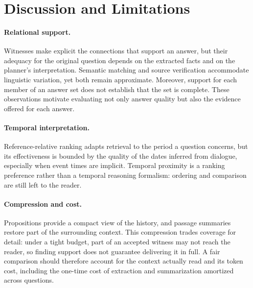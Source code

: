 \section{Discussion and Limitations}
\label{sec:discussion}

\paragraph{Relational support.}
Witnesses make explicit the connections that support an answer, but
their adequacy for the original question depends on the extracted facts
and on the planner's interpretation. Semantic matching and source
verification accommodate linguistic variation, yet both remain
approximate. Moreover, support for each member of an answer set does not
establish that the set is complete. These observations motivate
evaluating not only answer quality but also the evidence offered for
each answer.

\paragraph{Temporal interpretation.}
Reference-relative ranking adapts retrieval to the period a question
concerns, but its effectiveness is bounded by the quality of the dates
inferred from dialogue, especially when event times are implicit.
Temporal proximity is a ranking preference rather than a temporal
reasoning formalism: ordering and comparison are still left to the
reader.

\paragraph{Compression and cost.}
Propositions provide a compact view of the history, and passage summaries
restore part of the surrounding context. This compression trades
coverage for detail: under a tight budget, part of an accepted witness
may not reach the reader, so finding support does not guarantee
delivering it in full. A fair comparison should therefore account for
the context actually read and its token cost, including the one-time
cost of extraction and summarization amortized across questions.

